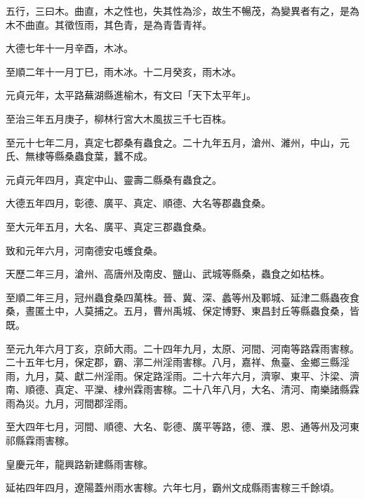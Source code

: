 \begin{pinyinscope}
 五行，三曰木。曲直，木之性也，失其性為沴，故生不暢茂，為變異者有之，是為木不曲直。其徵恆雨，其色青，是為青眚青祥。



 大德七年十一月辛酉，木冰。



 至順二年十一月丁巳，雨木冰。十二月癸亥，雨木冰。



 元貞元年，太平路蕪湖縣進榆木，有文曰「天下太平年」。



 至治三年五月庚子，柳林行宮大木風拔三千七百株。



 至元十七年二月，真定七郡桑有蟲食之。二十九年五月，滄州、濰州，中山，元氏、無棣等縣桑蟲食葉，蠶不成。



 元貞元年四月，真定中山、靈壽二縣桑有蟲食之。



 大德五年四月，彰德、廣平、真定、順德、大名等郡蟲食桑。



 至大元年五月，大名、廣平、真定三郡蟲食桑。



 致和元年六月，河南德安屯蠖食桑。



 天歷二年三月，滄州、高唐州及南皮、鹽山、武城等縣桑，蟲食之如枯株。



 至順二年三月，冠州蟲食桑四萬株。晉、冀、深、蠡等州及鄆城、延津二縣蟲夜食桑，晝匿土中，人莫捕之。五月，曹州禹城、保定博野、東昌封丘等縣蟲食桑，皆既。



 至元九年六月丁亥，京師大雨。二十四年九月，太原、河間、河南等路霖雨害稼。二十五年七月，保定郡，霸、漷二州淫雨害稼。八月，嘉祥、魚臺、金鄉三縣淫雨，九月，莫、獻二州淫雨。保定路淫雨。二十六年六月，濟寧、東平、汴梁、濟南、順德、真定、平灤、棣州霖雨害稼。二十八年八月，大名、清河、南樂諸縣霖雨為災。九月，河間郡淫雨。



 至大四年七月，河間、順德、大名、彰德、廣平等路，德、濮、恩、通等州及河東祁縣霖雨害稼。



 皇慶元年，龍興路新建縣雨害稼。



 延祐四年四月，遼陽蓋州雨水害稼。六年七月，霸州文成縣雨害稼三千餘頃。




\end{pinyinscope}
